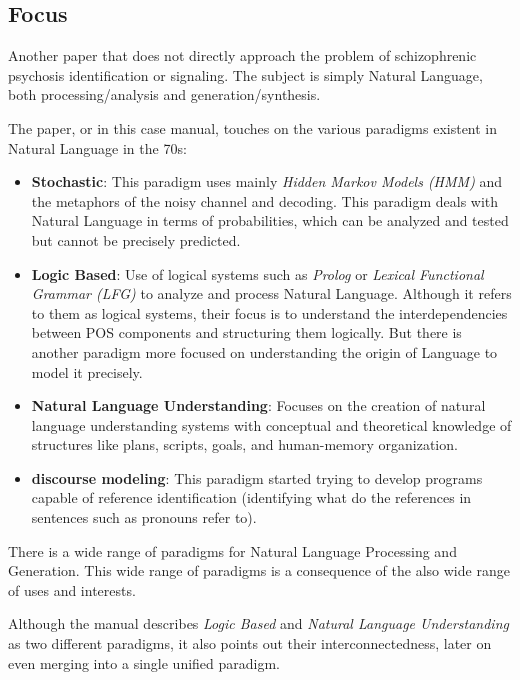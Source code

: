 \documentclass{Paper_Summary}
\begin{document}
\makepapertitle

\breakline

\begin{center}
    \section*{Focus}
\end{center}
    
    Another paper that does not directly approach the problem of schizophrenic psychosis identification or signaling. The subject is simply Natural Language, both processing/analysis and generation/synthesis.

    The paper, or in this case manual, touches on the various paradigms existent in Natural Language in the 70s:
    \begin{itemize}
        \item \textbf{Stochastic}: This paradigm uses mainly \emph{Hidden Markov Models (HMM)} and the metaphors of the noisy channel and decoding. This paradigm deals with Natural Language in terms of probabilities, which can be analyzed and tested but cannot be precisely predicted.
        \item \textbf{Logic Based}: Use of logical systems such as \emph{Prolog} or \emph{Lexical Functional Grammar (LFG)} to analyze and process Natural Language. Although it refers to them as logical systems, their focus is to understand the interdependencies between POS components and structuring them logically. But there is another paradigm more focused on understanding the origin of Language to model it precisely.
        \item \textbf{Natural Language Understanding}: Focuses on the creation of natural language understanding systems with conceptual and theoretical knowledge of structures like plans, scripts, goals, and human-memory organization.
        \item \textbf{discourse modeling}: This paradigm started trying to develop programs capable of reference identification (identifying what do the references in sentences such as pronouns refer to).
    \end{itemize}

    There is a wide range of paradigms for Natural Language Processing and Generation. This wide range of paradigms is a consequence of the also wide range of uses and interests.

    Although the manual describes \emph{Logic Based} and \emph{Natural Language Understanding} as two different paradigms, it also points out their interconnectedness, later on even merging into a single unified paradigm.
\end{document}
